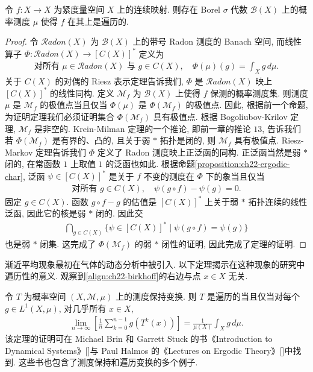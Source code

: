 \documentclass[../../main.tex]{subfiles}
\begin{document}
\begin{theorem}[遍历概率测度的存在性]\label{theorem:ch22-ergodic-existence}
令 $f:X\to X$ 为紧度量空间 $X$ 上的连续映射. 则存在 Borel $\sigma$ 代数 $\mathcal{B}(X)$ 上的概率测度 $\mu$ 使得 $f$ 在其上是遍历的.
\end{theorem}

\begin{proof}
令 $\mathcal{R}adon(X)$ 为 $\mathcal{B}(X)$ 上的带号 Radon 测度的 Banach 空间, 而线性算子 $\Phi:\mathcal{R}adon(X)\to[C(X)]^{*}$ 定义为
\begin{align*}
\text{对所有 }\mu\in\mathcal{R}adon(X)\text{ 与 }g\in C(X),\quad\Phi(\mu)(g)=\int_{X}g\,d\mu.
\end{align*}
关于 $C(X)$ 的对偶的 Riesz 表示定理告诉我们, $\Phi$ 是 $\mathcal{R}adon(X)$ 映上 $[C(X)]^{*}$ 的线性同构. 定义 $\mathcal{M}_{f}$ 为 $\mathcal{B}(X)$ 上使得 $f$ 保测的概率测度集. 则测度 $\mu$ 是 $\mathcal{M}_{f}$ 的极值点当且仅当 $\Phi(\mu)$ 是 $\Phi(\mathcal{M}_{f})$ 的极值点. 因此, 根据前一个命题, 为证明定理我们必须证明集合 $\Phi(\mathcal{M}_{f})$ 具有极值点. 根据 Bogoliubov-Krilov 定理, $\mathcal{M}_{f}$ 是非空的. Krein-Milman 定理的一个推论, 即前一章的推论 $13$, 告诉我们若 $\Phi(\mathcal{M}_{f})$ 是有界的、凸的, 且关于弱 $*$ 拓扑是闭的, 则 $\mathcal{M}_{f}$ 具有极值点. Riesz-Markov 定理告诉我们 $\Phi$ 定义了 Radon 测度映上正泛函的同构. 正泛函当然是弱 $*$ 闭的, 在常函数 $1$ 上取值 $1$ 的泛函也如此. 根据命题\cref{proposition:ch22-ergodic-char}, 泛函 $\psi\in[C(X)]^{*}$ 是关于 $f$ 不变的测度在 $\Phi$ 下的象当且仅当
\begin{align*}
\text{对所有 }g\in C(X),\quad\psi(g\circ f)-\psi(g)=0.
\end{align*}
固定 $g\in C(X)$. 函数 $g\circ f-g$ 的估值是 $[C(X)]^{*}$ 上关于弱 $*$ 拓扑连续的线性泛函, 因此它的核是弱 $*$ 闭的. 因此交
\begin{align*}
\bigcap_{g\in C(X)}\{\psi\in[C(X)]^{*}\mid\psi(g\circ f)=\psi(g)\}
\end{align*}
也是弱 $*$ 闭集. 这完成了 $\Phi(\mathcal{M}_{f})$ 的弱 $*$ 闭性的证明, 因此完成了定理的证明.
\end{proof}

渐近平均现象最初在气体的动态分析中被引入. 以下定理揭示在这种现象的研究中遍历性的意义. 观察到\eqref{align:ch22-birkhoff}的右边与点 $x\in X$ 无关.

\begin{theorem}\label{theorem:ch22-birkhoff}
令 $T$ 为概率空间 $(X,\mathcal{M},\mu)$ 上的测度保持变换. 则 $T$ 是遍历的当且仅当对每个 $g\in L^{1}(X,\mu)$, 对几乎所有 $x\in X$,
\begin{align}
\lim_{n\to\infty}\left[\frac{1}{n}\sum_{k=0}^{n-1}g(T^{k}(x))\right]=\frac{1}{\mu(X)}\int_{X}g\,d\mu.
\label{align:ch22-birkhoff}
\end{align}
该定理的证明可在 Michael Brin 和 Garrett Stuck 的书《Introduction to Dynamical Systems》[\cite{BS02}]与 Paul Halmos 的《Lectures on Ergodic Theory》[\cite{Hal06}]中找到. 这些书也包含了测度保持和遍历变换的多个例子.
\end{theorem}
\end{document}
